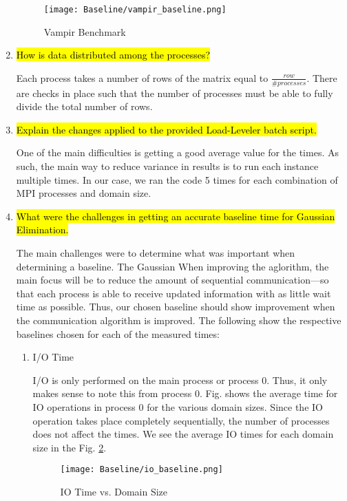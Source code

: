 \begin{enumerate}
 \begin{figure}[h] %
 	\begin{center}
  		\texttt{[image: Baseline/vampir\_baseline.png]} %
  		\caption{Vampir Benchmark}
  		\label{fig:vampir_baseline}
  	\end{center}
 \end{figure}

	\item \hl{How is data distributed among the processes?}

	Each process takes a number of rows of the matrix equal to $\frac{row}{\#processes}$. There are checks in place such that the number of processes must be able to fully divide the total number of rows.

	\item \hl{Explain the changes applied to the provided Load-Leveler batch script.}

	One of the main difficulties is getting a good average value for the times. As such, the main way to reduce variance in results is to run each instance multiple times. In our case, we ran the code 5 times for each combination of MPI processes and domain size.

	\item \hl{What were the challenges in getting an accurate baseline time for Gaussian Elimination.}

	The main challenges were to determine what was important when determining a baseline. The Gaussian When improving the aglorithm, the main focus will be to reduce the amount of sequential communication---so that each process is able to receive updated information with as little wait time as possible. Thus, our chosen baseline should show improvement when the communication algorithm is improved. The following show the respective baselines chosen for each of the measured times:
\begin{enumerate}
	\item I/O Time

	I/O is only performed on the main process or process 0. Thus, it only makes sense to note this from process 0. Fig. shows the average time for IO operations in process 0 for the various domain sizes. Since the IO operation takes place completely sequentially, the number of processes does not affect the times. We see the average IO times for each domain size in the Fig. \ref{fig:IO}.
	
	
 \begin{figure}[h] %
 	\begin{center}
  		\texttt{[image: Baseline/io\_baseline.png]} %
  		\caption{IO Time vs. Domain Size}
  		\label{fig:IO}
  	\end{center}
 \end{figure}


\end{enumerate}
\end{enumerate}
